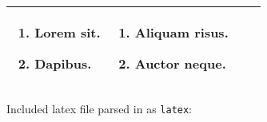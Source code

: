 \documentclass[
  12pt,
  british,
  a4paper,
  twoside,
  titlepage,
  openright,
  numbers=noenddot,
  chapterprefix=true,
  headings=optiontohead,
  svgnames,
  dvipsnames]{scrreprt}
\providecommand{\tightlist}{%
  \setlength{\itemsep}{0pt}\setlength{\parskip}{0pt}}
\begin{document}
\begin{longtable}[]{@{}llll@{}}
\begin{minipage}[t]{0.22\columnwidth}
\begin{enumerate}
\tightlist
\item
  Lorem sit.
\item
  Dapibus.
\end{enumerate}\strut
\end{minipage} & \begin{minipage}[t]{0.22\columnwidth}\raggedright
\begin{enumerate}
\tightlist
\item
  Aliquam risus.
\item
  Auctor neque.
\end{enumerate}\strut
\end{minipage}\tabularnewline
\bottomrule
\end{longtable}

Included latex file parsed in as \texttt{latex}:
\end{document}
